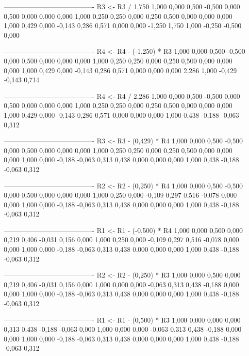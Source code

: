 \documentclass[12pt]{article}
\begin{document}
\begin{enumerate}
\begin{keluaran}
----------------------------------------
R3 <- R3 / 1,750
1,000   0,000   0,500   -0,500  0,000   0,500   0,000   0,000
0,000   1,000   0,250   0,250   0,000   0,250   0,500   0,000
0,000   0,000   1,000   0,429   0,000   -0,143  0,286   0,571
0,000   0,000   -1,250  1,750   1,000   -0,250  -0,500  0,000

----------------------------------------
R4 <- R4 - (-1,250) * R3
1,000   0,000   0,500   -0,500  0,000   0,500   0,000   0,000
0,000   1,000   0,250   0,250   0,000   0,250   0,500   0,000
0,000   0,000   1,000   0,429   0,000   -0,143  0,286   0,571
0,000   0,000   0,000   2,286   1,000   -0,429  -0,143  0,714

----------------------------------------
R4 <- R4 / 2,286
1,000   0,000   0,500   -0,500  0,000   0,500   0,000   0,000
0,000   1,000   0,250   0,250   0,000   0,250   0,500   0,000
0,000   0,000   1,000   0,429   0,000   -0,143  0,286   0,571
0,000   0,000   0,000   1,000   0,438   -0,188  -0,063  0,312

----------------------------------------
R3 <- R3 - (0,429) * R4
1,000   0,000   0,500   -0,500  0,000   0,500   0,000   0,000
0,000   1,000   0,250   0,250   0,000   0,250   0,500   0,000
0,000   0,000   1,000   0,000   -0,188  -0,063  0,313   0,438
0,000   0,000   0,000   1,000   0,438   -0,188  -0,063  0,312

----------------------------------------
R2 <- R2 - (0,250) * R4
1,000   0,000   0,500   -0,500  0,000   0,500   0,000   0,000
0,000   1,000   0,250   0,000   -0,109  0,297   0,516   -0,078
0,000   0,000   1,000   0,000   -0,188  -0,063  0,313   0,438
0,000   0,000   0,000   1,000   0,438   -0,188  -0,063  0,312

----------------------------------------
R1 <- R1 - (-0,500) * R4
1,000   0,000   0,500   0,000   0,219   0,406   -0,031  0,156
0,000   1,000   0,250   0,000   -0,109  0,297   0,516   -0,078
0,000   0,000   1,000   0,000   -0,188  -0,063  0,313   0,438
0,000   0,000   0,000   1,000   0,438   -0,188  -0,063  0,312

----------------------------------------
R2 <- R2 - (0,250) * R3
1,000   0,000   0,500   0,000   0,219   0,406   -0,031  0,156
0,000   1,000   0,000   0,000   -0,063  0,313   0,438   -0,188
0,000   0,000   1,000   0,000   -0,188  -0,063  0,313   0,438
0,000   0,000   0,000   1,000   0,438   -0,188  -0,063  0,312

----------------------------------------
R1 <- R1 - (0,500) * R3
1,000   0,000   0,000   0,000   0,313   0,438   -0,188  -0,063
0,000   1,000   0,000   0,000   -0,063  0,313   0,438   -0,188
0,000   0,000   1,000   0,000   -0,188  -0,063  0,313   0,438
0,000   0,000   0,000   1,000   0,438   -0,188  -0,063  0,312


\end{keluaran}
\end{enumerate}
\end{document}
